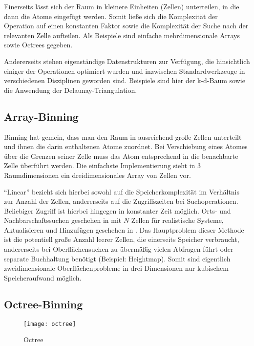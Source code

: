 Einerseits lässt sich der Raum in kleinere Einheiten (Zellen) unterteilen, in die dann die Atome eingefügt werden.
Somit ließe sich die Komplexität der Operation auf einen konstanten Faktor sowie die Komplexität der Suche nach der relevanten Zelle aufteilen.
Als Beispiele sind einfache mehrdimensionale Arrays sowie Octrees gegeben.

Andererseits stehen eigenständige Datenstrukturen zur Verfügung, die hinsichtlich einiger der Operationen optimiert wurden und inzwischen Standardwerkzeuge in verschiedenen Disziplinen geworden sind.
Beispiele sind hier der k-d-Baum sowie die Anwendung der Delaunay-Triangulation.

\subsection{Array-Binning}

Binning hat gemein, dass man den Raum in ausreichend große Zellen unterteilt und ihnen die darin enthaltenen Atome zuordnet.
Bei Verschiebung eines Atomes über die Grenzen seiner Zelle muss das Atom entsprechend in die benachbarte Zelle überführt werden.
Die einfachste Implementierung sieht in 3 Raumdimensionen ein dreidimensionales Array von Zellen vor.

``Linear'' bezieht sich hierbei sowohl auf die Speicherkomplexität im Verhältnis zur Anzahl der Zellen, andererseits auf die Zugriffszeiten bei Suchoperationen. Beliebiger Zugriff ist hierbei hingegen in konstanter Zeit möglich.
Orts- und Nachbarschaftssuchen geschehen in  mit $N$ Zellen für realistische Systeme, Aktualisieren und Hinzufügen geschehen in .
Das Hauptproblem dieser Methode ist die potentiell große Anzahl leerer Zellen, die einerseits Speicher verbraucht, andererseits bei Oberflächensuchen zu übermäßig vielen Abfragen führt oder separate Buchhaltung benötigt (Beispiel: Heightmap).
Somit sind eigentlich zweidimensionale Oberflächenprobleme in drei Dimensionen nur kubischem Speicheraufwand möglich.

\subsection{Octree-Binning}

\begin{figure}[tbhp]
  \centering
  \texttt{[image: octree]}
  \caption[Octree]{Octree}
  \label{fig:octree}
\end{figure}

